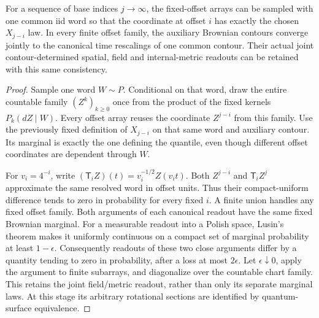 \begin{lemma}
\label{comp:quantile-couplings}
For a sequence of base indices $j\to\infty$, the fixed-offset arrays
can be sampled with one common iid word so that the coordinate at
offset $i$ has exactly the chosen $X_{j-i}$ law.  In every finite
offset family, the auxiliary Brownian contours converge jointly to
the canonical time rescalings of one common contour.  Their actual
joint contour-determined spatial, field and internal-metric readouts
can be retained with this same consistency.
\end{lemma}

\begin{proof}
Sample one word $W\sim P$.  Conditional on that word, draw the entire
countable family $(Z^k)_{k\ge0}$ once from the product of the fixed
kernels $P_k(dZ\mid W)$.  Every offset array reuses the coordinate
$Z^{j-i}$ from this family.  Use the
previously fixed definition of $X_{j-i}$ on that same word and
auxiliary contour.  Its marginal is exactly the one defining the
quantile, even though different offset coordinates are dependent
through $W$.

For $v_i=4^{-i}$, write
$(\mathsf T_i Z)(t)=v_i^{-1/2}Z(v_it)$.  Both $Z^{j-i}$ and
$\mathsf T_i Z^j$ approximate the same resolved word in offset
units.  Thus their compact-uniform difference tends to zero in
probability for every fixed $i$.  A finite union handles any fixed
offset family.  Both arguments of each canonical readout have the
same fixed Brownian marginal.  For a measurable readout into a
Polish space, Lusin's theorem makes it uniformly continuous on a
compact set of marginal probability at least $1-\epsilon$.
Consequently readouts of these two close arguments differ by a
quantity tending to zero in probability, after a loss at most
$2\epsilon$.  Let $\epsilon\downarrow0$, apply the argument to
finite subarrays, and diagonalize over the countable chart family.
This retains the joint field/metric readout, rather than only its
separate marginal laws.  At this stage its arbitrary rotational
sections are identified by quantum-surface equivalence.


\end{proof}
